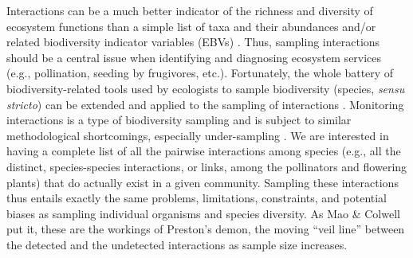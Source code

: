 \documentclass[12pt]{article}
\begin{document}
Interactions can be a much better indicator of the richness and diversity of ecosystem functions than a simple list of taxa and their abundances and\slash or related biodiversity indicator variables (EBVs) \citep{Memmott:2006vy,ValienteBanuet:2014bw}. Thus, sampling interactions should be a central issue when identifying and diagnosing ecosystem services (e.g., pollination,  seeding by frugivores, etc.). Fortunately, the whole battery of biodiversity-related tools used by ecologists to sample biodiversity (species, \emph{sensu stricto}) can be extended and applied to the sampling of interactions \citep[see Table 2 in][]{Colwell:2004fi}. Monitoring interactions is a type of biodiversity sampling and is subject to similar methodological shortcomings, especially under-sampling \citep{E31/2562,Jordano:2009c,Vazquez:2009p82,Dorado:2011cf,RiveraHutinel:2012vn}. We are interested in having a complete list of all the pairwise interactions among species (e.g., all the distinct, species-species interactions, or links, among the pollinators and flowering plants) that do actually exist in a given community. Sampling these interactions thus entails exactly the same problems, limitations, constraints, and potential biases as sampling individual organisms and species diversity. As Mao \& Colwell \citeyearpar{Mao:2005tka} put it, these are the workings of Preston’s demon, the moving ``veil line'' \citep{E2/813} between the detected and the undetected interactions as sample size increases.
\end{document}
